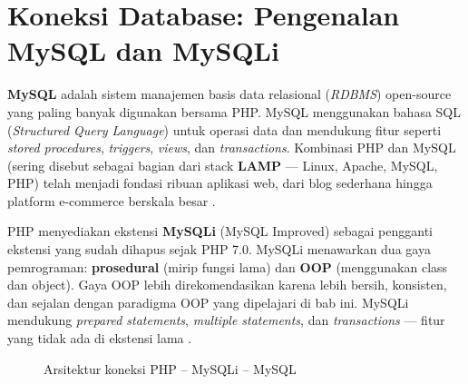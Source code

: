 ﻿\section{Koneksi Database: Pengenalan MySQL dan MySQLi}

\textbf{MySQL} adalah sistem manajemen basis data relasional (\textit{RDBMS}) open-source yang paling banyak digunakan bersama PHP. MySQL menggunakan bahasa SQL (\textit{Structured Query Language}) untuk operasi data dan mendukung fitur seperti \textit{stored procedures}, \textit{triggers}, \textit{views}, dan \textit{transactions}. Kombinasi PHP dan MySQL (sering disebut sebagai bagian dari stack \textbf{LAMP} --- Linux, Apache, MySQL, PHP) telah menjadi fondasi ribuan aplikasi web, dari blog sederhana hingga platform e-commerce berskala besar \cite{mysqlDocs}.

PHP menyediakan ekstensi \textbf{MySQLi} (MySQL Improved) sebagai pengganti ekstensi  yang sudah dihapus sejak PHP 7.0. MySQLi menawarkan dua gaya pemrograman: \textbf{prosedural} (mirip fungsi lama) dan \textbf{OOP} (menggunakan class dan object). Gaya OOP lebih direkomendasikan karena lebih bersih, konsisten, dan sejalan dengan paradigma OOP yang dipelajari di bab ini. MySQLi mendukung \textit{prepared statements}, \textit{multiple statements}, dan \textit{transactions} --- fitur yang tidak ada di ekstensi lama \cite{phpManual}.

\begin{figure}[H]
\centering
{}
\caption{Arsitektur koneksi PHP -- MySQLi -- MySQL}
\end{figure}

